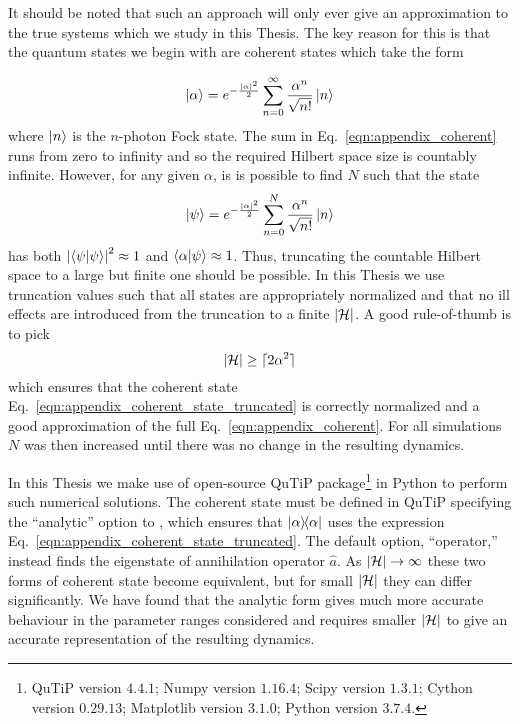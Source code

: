 It should be noted that such an approach will only ever give an approximation to the true systems which we study in this Thesis. The key reason for this is that the quantum states we begin with are coherent states which take the form

\begin{equation}\label{eqn:appendix_coherent}
\ket{\alpha} = e^{-\frac{\left|\alpha\right|^2}{2}}\sum_{n=0}^\infty \frac{\alpha^n}{\sqrt{n!}}\ket{n}
\end{equation}
where $\ket{n}$ is the $n$-photon Fock state. 
The sum in Eq.~\ref{eqn:appendix_coherent} runs from zero to infinity and so the required Hilbert space size is countably infinite. However, for any given $\alpha$, is is possible to find $N$ such that the state
\begin{equation}\label{eqn:appendix_coherent_state_truncated}
\ket{\psi} = e^{-\frac{\left|\alpha\right|^2}{2}}\sum_{n=0}^N \frac{\alpha^n}{\sqrt{n!}}\ket{n}
\end{equation} 
has both $\left| \ip{\psi} \right|^2 \approx 1$ and $\ip{\alpha}{\psi} \approx 1$. Thus, truncating the countable Hilbert space to a large but finite one should be possible. In this Thesis we use truncation values such that all states are appropriately normalized and that no ill effects are introduced from the truncation to a finite $\left|\mathcal{H}\right|$. A good rule-of-thumb is to pick
\begin{equation}\label{eqn:rule_of_thumb}
\left|\mathcal{H}\right| \ge \lceil 2 \alpha^2 \rceil
\end{equation}
which ensures that the coherent state Eq.~\ref{eqn:appendix_coherent_state_truncated} is correctly normalized and a good approximation of the full Eq.~\ref{eqn:appendix_coherent}. For all simulations $N$ was then increased until there was no change in the resulting dynamics.

In this Thesis we make use of open-source QuTiP package\footnote{QuTiP version $4.4.1$; Numpy version $1.16.4$; Scipy version $1.3.1$; Cython version $0.29.13$; Matplotlib version $3.1.0$; Python version $3.7.4$.} \cite{qutip2} in Python to perform such numerical solutions. The coherent state must be defined in QuTiP specifying the ``analytic'' option to , which ensures that $\dyad{\alpha}$ uses the expression Eq.~\ref{eqn:appendix_coherent_state_truncated}. The default option, ``operator,'' instead finds the eigenstate of annihilation operator $\hat{a}$. As $\left|\mathcal{H}\right| \rightarrow \infty$ these two forms of coherent state become equivalent, but for small $\left|\mathcal{H}\right|$ they can differ significantly. We have found that the analytic form gives much more accurate behaviour in the parameter ranges considered and requires smaller $\left|\mathcal{H}\right|$ to give an accurate representation of the resulting dynamics.

